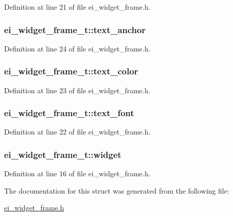 Definition at line 21 of file ei\-\_\-widget\-\_\-frame.\-h.

\hypertarget{structei__widget__frame__t_a3a69af5f59d337720b4f2b5af3d487bc}{
\subsubsection[{text\-\_\-anchor}]{ ei\-\_\-widget\-\_\-frame\-\_\-t\-::text\-\_\-anchor}}\label{structei__widget__frame__t_a3a69af5f59d337720b4f2b5af3d487bc}


Definition at line 24 of file ei\-\_\-widget\-\_\-frame.\-h.

\hypertarget{structei__widget__frame__t_acc7c5954f1ff3e079d40a600755f67d6}{
\subsubsection[{text\-\_\-color}]{ ei\-\_\-widget\-\_\-frame\-\_\-t\-::text\-\_\-color}}\label{structei__widget__frame__t_acc7c5954f1ff3e079d40a600755f67d6}


Definition at line 23 of file ei\-\_\-widget\-\_\-frame.\-h.

\hypertarget{structei__widget__frame__t_a6f9e54afa5805784c3feee588832e20d}{
\subsubsection[{text\-\_\-font}]{ ei\-\_\-widget\-\_\-frame\-\_\-t\-::text\-\_\-font}}\label{structei__widget__frame__t_a6f9e54afa5805784c3feee588832e20d}


Definition at line 22 of file ei\-\_\-widget\-\_\-frame.\-h.

\hypertarget{structei__widget__frame__t_ad375e0d41821e8f1dcf5e061d140ac0d}{
\subsubsection[{widget}]{ ei\-\_\-widget\-\_\-frame\-\_\-t\-::widget}}\label{structei__widget__frame__t_ad375e0d41821e8f1dcf5e061d140ac0d}


Definition at line 16 of file ei\-\_\-widget\-\_\-frame.\-h.



The documentation for this struct was generated from the following file\-:\begin{DoxyCompactItemize}
\item 
\hyperlink{ei__widget__frame_8h}{ei\-\_\-widget\-\_\-frame.\-h}\end{DoxyCompactItemize}
